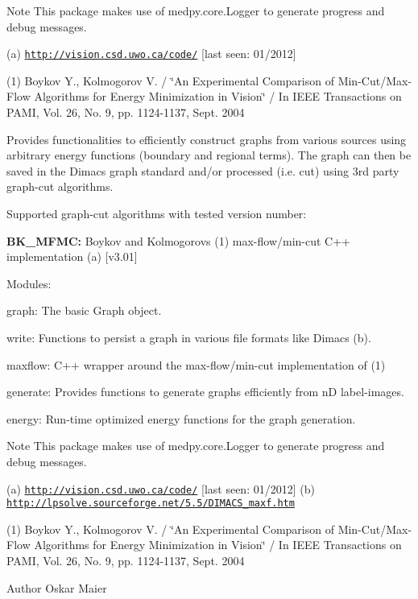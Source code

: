 \begin{DoxyNote}{Note}
This package makes use of  medpy.core.Logger to generate progress and debug messages.
\end{DoxyNote}
(a) \href{http://vision.csd.uwo.ca/code/}{\tt http://vision.csd.uwo.ca/code/} \mbox{[}last seen: 01/2012\mbox{]}

(1) Boykov Y., Kolmogorov V. / \char`\"{}An Experimental Comparison of Min-\/Cut/Max-\/Flow
 Algorithms for Energy Minimization in Vision\char`\"{} / In IEEE Transactions on PAMI, Vol. 26, No. 9, pp. 1124-\/1137, Sept. 2004

Provides functionalities to efficiently construct graphs from various sources using arbitrary energy functions (boundary and regional terms). The graph can then be saved in the Dimacs graph standard and/or processed (i.e. cut) using 3rd party graph-\/cut algorithms.

Supported graph-\/cut algorithms with tested version number:\par

\begin{DoxyItemize}
\item {\bfseries BK\_\-MFMC:} Boykov and Kolmogorovs (1) max-\/flow/min-\/cut C++ implementation (a) \mbox{[}v3.01\mbox{]}
\end{DoxyItemize}

Modules:
\begin{DoxyItemize}
\item graph: The basic Graph object.
\item write: Functions to persist a graph in various file formats like Dimacs (b).
\item maxflow: C++ wrapper around the max-\/flow/min-\/cut implementation of (1)
\item generate: Provides functions to generate graphs efficiently from nD label-\/images.
\item energy: Run-\/time optimized energy functions for the graph generation.
\end{DoxyItemize}

\begin{DoxyNote}{Note}
This package makes use of  medpy.core.Logger to generate progress and debug messages.
\end{DoxyNote}
(a) \href{http://vision.csd.uwo.ca/code/}{\tt http://vision.csd.uwo.ca/code/} \mbox{[}last seen: 01/2012\mbox{]} (b) \href{http://lpsolve.sourceforge.net/5.5/DIMACS_maxf.htm}{\tt http://lpsolve.sourceforge.net/5.5/DIMACS\_\-maxf.htm}

(1) Boykov Y., Kolmogorov V. / \char`\"{}An Experimental Comparison of Min-\/Cut/Max-\/Flow
 Algorithms for Energy Minimization in Vision\char`\"{} / In IEEE Transactions on PAMI, Vol. 26, No. 9, pp. 1124-\/1137, Sept. 2004

\begin{DoxyAuthor}{Author}
Oskar Maier 
\end{DoxyAuthor}
